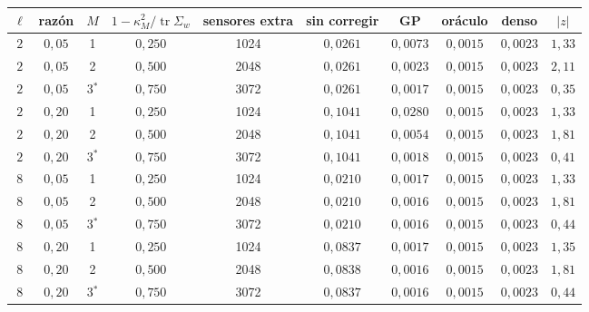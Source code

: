 \begin{tabular}{cccccccccc}
\toprule
$\ell$ & razón & $M$ & $1 - \kappa_M^2/\operatorname{tr}\Sigma_w$ & sensores extra & sin corregir & GP & oráculo & denso & $|z|$ \\
\midrule
$2$ & $0{,}05$ & 1 & $0{,}250$ & 1024 & $0{,}0261$ & $0{,}0073$ & $0{,}0015$ & $0{,}0023$ & $1{,}33$ \\
$2$ & $0{,}05$ & 2 & $0{,}500$ & 2048 & $0{,}0261$ & $0{,}0023$ & $0{,}0015$ & $0{,}0023$ & $2{,}11$ \\
$2$ & $0{,}05$ & 3$^*$ & $0{,}750$ & 3072 & $0{,}0261$ & $0{,}0017$ & $0{,}0015$ & $0{,}0023$ & $0{,}35$ \\
$2$ & $0{,}20$ & 1 & $0{,}250$ & 1024 & $0{,}1041$ & $0{,}0280$ & $0{,}0015$ & $0{,}0023$ & $1{,}33$ \\
$2$ & $0{,}20$ & 2 & $0{,}500$ & 2048 & $0{,}1041$ & $0{,}0054$ & $0{,}0015$ & $0{,}0023$ & $1{,}81$ \\
$2$ & $0{,}20$ & 3$^*$ & $0{,}750$ & 3072 & $0{,}1041$ & $0{,}0018$ & $0{,}0015$ & $0{,}0023$ & $0{,}41$ \\
$8$ & $0{,}05$ & 1 & $0{,}250$ & 1024 & $0{,}0210$ & $0{,}0017$ & $0{,}0015$ & $0{,}0023$ & $1{,}33$ \\
$8$ & $0{,}05$ & 2 & $0{,}500$ & 2048 & $0{,}0210$ & $0{,}0016$ & $0{,}0015$ & $0{,}0023$ & $1{,}81$ \\
$8$ & $0{,}05$ & 3$^*$ & $0{,}750$ & 3072 & $0{,}0210$ & $0{,}0016$ & $0{,}0015$ & $0{,}0023$ & $0{,}44$ \\
$8$ & $0{,}20$ & 1 & $0{,}250$ & 1024 & $0{,}0837$ & $0{,}0017$ & $0{,}0015$ & $0{,}0023$ & $1{,}35$ \\
$8$ & $0{,}20$ & 2 & $0{,}500$ & 2048 & $0{,}0838$ & $0{,}0016$ & $0{,}0015$ & $0{,}0023$ & $1{,}81$ \\
$8$ & $0{,}20$ & 3$^*$ & $0{,}750$ & 3072 & $0{,}0837$ & $0{,}0016$ & $0{,}0015$ & $0{,}0023$ & $0{,}44$ \\
\bottomrule
\end{tabular}
